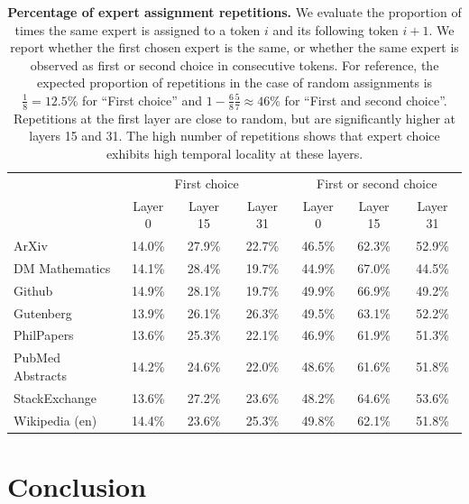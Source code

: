 \documentclass{article}
\begin{document}
\begin{table}
\small
\centering

\begin{tabular}{l|ccc|ccc}
\toprule
& \multicolumn{3}{c}{First choice} & \multicolumn{3}{c}{First or second choice} \\
 & Layer 0 & Layer 15 & Layer 31 & Layer 0 & Layer 15 & Layer 31 \\
\midrule
ArXiv & 14.0\% & 27.9\% & 22.7\% & 46.5\% & 62.3\% & 52.9\% \\
DM Mathematics & 14.1\% & 28.4\% & 19.7\% & 44.9\% & 67.0\% & 44.5\% \\
Github & 14.9\% & 28.1\% & 19.7\% & 49.9\% & 66.9\% & 49.2\% \\
Gutenberg & 13.9\% & 26.1\% & 26.3\% & 49.5\% & 63.1\% & 52.2\% \\
PhilPapers & 13.6\% & 25.3\% & 22.1\% & 46.9\% & 61.9\% & 51.3\% \\
PubMed Abstracts & 14.2\% & 24.6\% & 22.0\% & 48.6\% & 61.6\% & 51.8\% \\
StackExchange & 13.6\% & 27.2\% & 23.6\% & 48.2\% & 64.6\% & 53.6\% \\
Wikipedia (en) & 14.4\% & 23.6\% & 25.3\% & 49.8\% & 62.1\% & 51.8\% \\
\bottomrule
\end{tabular}


\vspace{10pt}
\caption{
\small
\textbf{Percentage of expert assignment repetitions.}
 We evaluate the proportion of times the same expert is assigned to a token $i$ and its following token $i+1$. We report whether the first chosen expert is the same, or whether the same expert is observed as first or second choice in consecutive tokens.
For reference, the expected proportion of repetitions in the case of random assignments is $\frac{1}{8}=12.5\%$ for ``First choice'' and $1-\frac{6}{8} \frac{5}{7} \approx 46\%$ for ``First and second choice''.
Repetitions at the first layer are close to random, but are significantly higher at layers 15 and 31.
The high number of repetitions shows that expert choice exhibits high temporal locality at these layers. 
}
\vspace{-10pt}
\label{tab:smoerepeat}
\end{table}

\section{Conclusion}
\vspace{-5pt}
\end{document}
